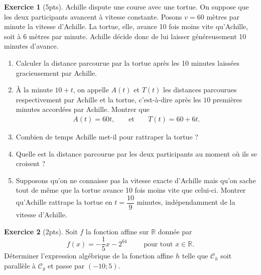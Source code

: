 \documentclass[12pt]{paper}
\theoremstyle{theorem}
\theoremstyle{definition}
\newtheorem{ex}{Exercice}
\newcommand{\C}{\mathcal{C}}
\newcommand{\R}{\mathbb{R}}
\newcommand{\exe}[2]{
		\begin{ex} #1  \end{ex}
		\begin{sol} #2 \end{sol}
	}
\newcommand{\exe}[2]{
		\begin{ex} #1  \end{ex}
	}
\begin{document}

\exe{[5pts]
    Achille dispute une course avec une tortue. On suppose que les deux participants avancent à vitesse constante. Posons $v = 60$ mètres par minute la vitesse d'Achille.
    La tortue, elle, avance 10 fois moins vite qu’Achille, soit à $6$ mètres par minute. 
    Achille décide donc de lui laisser généreusement 10 minutes d’avance.

    
	\begin{enumerate}
        \item Calculer la distance parcourue par la tortue après les 10 minutes laissées gracieusement par Achille.
        \item \`A la minute $10+t$, on appelle $A(t)$ et $T(t)$ les distances parcourues respectivement par Achille et la tortue, c'est-à-dire après les $10$ premières minutes accordées par Achille.
        Montrer que
            \begin{align*}
                A(t) = 60 t, && \text{ et } && T(t) = 60 + 6t.
            \end{align*}
        \item Combien de temps Achille met-il pour rattraper la tortue ?
        \item Quelle est la distance parcourue par les deux participants au moment où ils se croisent ?
        \item Supposons qu'on ne connaisse pas la vitesse exacte d'Achille mais qu'on sache tout de même que la tortue avance 10 fois moins vite que celui-ci.
        Montrer qu'Achille rattrape la tortue en $t = \dfrac{10}{9}$ minutes, indépendamment de la vitesse d'Achille.
	\end{enumerate}
	
}{}
\newpage

\exe{[2pts]
	Soit $f$ la fonction affine sur $\R$ donnée par
		\[ f(x) = -\frac15 x - 2^{64} \qquad \text{ pour tout } x\in\R. \]
    Déterminer l'expression algébrique de la fonction affine $h$ telle que $\C_h$ soit parallèle à $\C_g$ et passe par $(-10;5)$.
}{}
\end{document}
